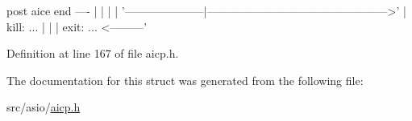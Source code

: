 \begin{DoxyPre}
                                                             post aice          end ----                                                  |
                                                                  |                     |                                                 |
                                                                  '---------------------|------------------------------------------------>'
                                                                                        |
kill:                                                                  ...              |
                                                                        |               |
exit:                                                                  ...    <---------'\end{DoxyPre}



\begin{DoxyPre}\end{DoxyPre}
 

Definition at line 167 of file aicp.\-h.



The documentation for this struct was generated from the following file\-:\begin{DoxyCompactItemize}
\item 
src/asio/\hyperlink{aicp_8h}{aicp.\-h}\end{DoxyCompactItemize}
